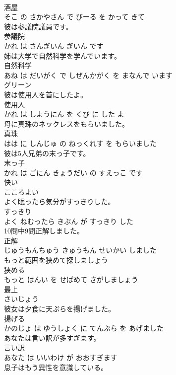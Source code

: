 \documentclass[8pt]{extreport}
\begin{document}
\begin{CJK}{UTF8}{min}
\\	酒屋 
\\	そこ の さかやさん で びーる を かって きて			
\\	彼は参議院議員です。	
\\	参議院 
\\	かれ は さんぎいん ぎいん です			
\\	姉は大学で自然科学を学んでいます。	
\\	自然科学 
\\	あね は だいがく で しぜんかがく を まなんで います			
\\	グリーン	
\\	彼は使用人を首にしたよ。	
\\	使用人 
\\	かれ は しようにん を くび に した よ			
\\	母に真珠のネックレスをもらいました。	
\\	真珠 
\\	はは に しんじゅ の ねっくれす を もらいました			
\\	彼は5人兄弟の末っ子です。	
\\	末っ子 
\\	かれ は ごにん きょうだい の すえっこ です			
\\	快い	
\\	こころよい		
\\	よく眠ったら気分がすっきりした。	
\\	すっきり 
\\	よく ねむったら きぶん が すっきり した			
\\	10問中9問正解しました。	
\\	正解 
\\	じゅうもんちゅう きゅうもん せいかい しました			
\\	もっと範囲を狭めて探しましょう	
\\	狭める 
\\	もっと はんい を せばめて さがしましょう			
\\	最上	
\\	さいじょう		
\\	彼女は夕食に天ぷらを揚げました。	
\\	揚げる 
\\	かのじょ は ゆうしょく に てんぷら を あげました			
\\	あなたは言い訳が多すぎます。	
\\	言い訳 
\\	あなた は いいわけ が おおすぎます			
\\	息子はもう異性を意識している。	

\end{CJK}
\end{document}
